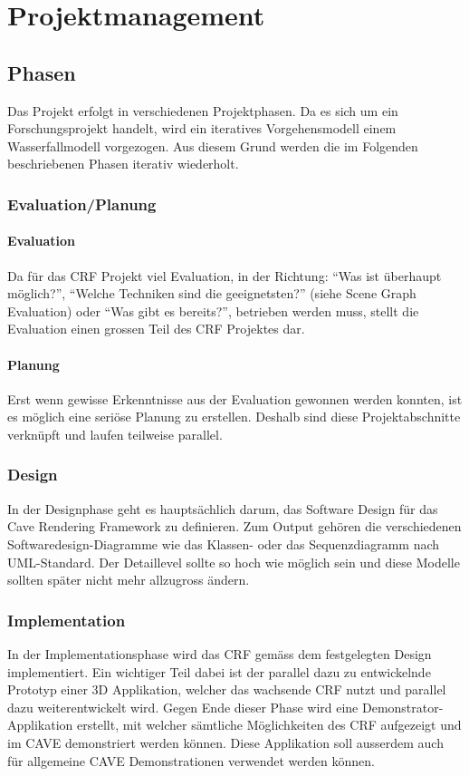 \chapter{Projektmanagement}

\section{Phasen}
Das Projekt erfolgt in verschiedenen Projektphasen. Da es sich um ein Forschungsprojekt handelt, wird ein iteratives Vorgehensmodell einem Wasserfallmodell vorgezogen. Aus diesem Grund werden die im Folgenden beschriebenen Phasen iterativ wiederholt.

\subsection{Evaluation/Planung}
\subsubsection{Evaluation}
Da f\"ur das CRF Projekt viel Evaluation, in der Richtung: "`Was ist \"uberhaupt m\"oglich?"', "`Welche Techniken sind die geeignetsten?"' (siehe Scene Graph Evaluation) oder "`Was gibt es bereits?"', betrieben werden muss, stellt die Evaluation einen grossen Teil des CRF Projektes dar. 

\subsubsection{Planung}
Erst wenn gewisse Erkenntnisse aus der Evaluation gewonnen werden konnten, ist es m\"oglich eine seri\"ose Planung zu erstellen. Deshalb sind diese Projektabschnitte verkn\"upft und laufen teilweise parallel.

\subsection{Design}
In der Designphase geht es haupts\"achlich darum, das Software Design f\"ur das Cave Rendering Framework zu definieren. Zum Output geh\"oren die verschiedenen Softwaredesign-Diagramme wie das Klassen- oder das Sequenzdiagramm nach UML-Standard. Der Detaillevel sollte so hoch wie m\"oglich sein und diese Modelle sollten sp\"ater nicht mehr allzugross \"andern. 

\subsection{Implementation}
In der Implementationsphase wird das CRF gem\"ass dem festgelegten Design implementiert. Ein wichtiger Teil dabei ist der parallel dazu zu entwickelnde Prototyp einer 3D Applikation, welcher das wachsende CRF nutzt und parallel dazu weiterentwickelt wird. Gegen Ende dieser Phase wird eine Demonstrator-Applikation erstellt, mit welcher s\"amtliche M\"oglichkeiten des CRF aufgezeigt und im CAVE demonstriert werden k\"onnen. Diese Applikation soll ausserdem auch f\"ur allgemeine CAVE Demonstrationen verwendet werden k\"onnen.

